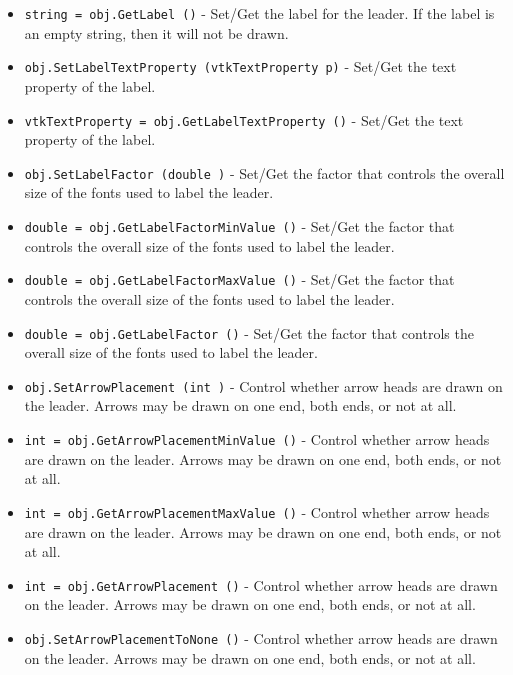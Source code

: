 \begin{itemize}
\item  \verb|string = obj.GetLabel ()| -  Set/Get the label for the leader. If the label is an empty string, then
 it will not be drawn.

\item  \verb|obj.SetLabelTextProperty (vtkTextProperty p)| -  Set/Get the text property of the label.

\item  \verb|vtkTextProperty = obj.GetLabelTextProperty ()| -  Set/Get the text property of the label.

\item  \verb|obj.SetLabelFactor (double )| -  Set/Get the factor that controls the overall size of the fonts used
 to label the leader. 

\item  \verb|double = obj.GetLabelFactorMinValue ()| -  Set/Get the factor that controls the overall size of the fonts used
 to label the leader. 

\item  \verb|double = obj.GetLabelFactorMaxValue ()| -  Set/Get the factor that controls the overall size of the fonts used
 to label the leader. 

\item  \verb|double = obj.GetLabelFactor ()| -  Set/Get the factor that controls the overall size of the fonts used
 to label the leader. 

\item  \verb|obj.SetArrowPlacement (int )| -  Control whether arrow heads are drawn on the leader. Arrows may be
 drawn on one end, both ends, or not at all.

\item  \verb|int = obj.GetArrowPlacementMinValue ()| -  Control whether arrow heads are drawn on the leader. Arrows may be
 drawn on one end, both ends, or not at all.

\item  \verb|int = obj.GetArrowPlacementMaxValue ()| -  Control whether arrow heads are drawn on the leader. Arrows may be
 drawn on one end, both ends, or not at all.

\item  \verb|int = obj.GetArrowPlacement ()| -  Control whether arrow heads are drawn on the leader. Arrows may be
 drawn on one end, both ends, or not at all.

\item  \verb|obj.SetArrowPlacementToNone ()| -  Control whether arrow heads are drawn on the leader. Arrows may be
 drawn on one end, both ends, or not at all.


\end{itemize}
